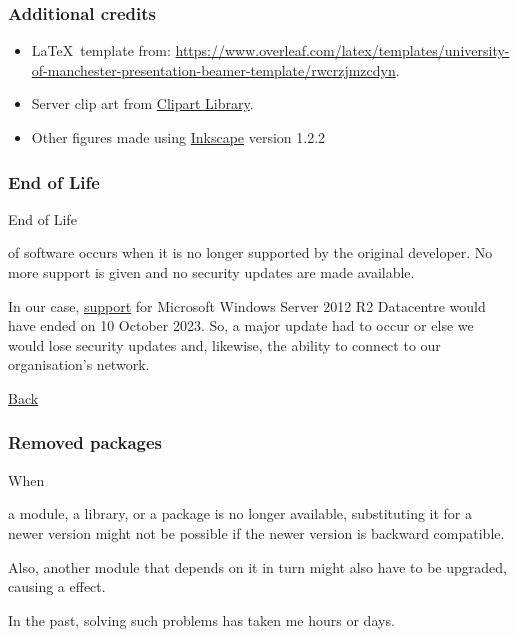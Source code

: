 \documentclass[11pt,aspectratio=43,ignorenonframetext,t]{beamer}
\begin{document}
\begin{frame}

\frametitle{Additional credits}

\begin{itemize}
  \item \LaTeX\ template from:  \href{https://www.overleaf.com/latex/templates/university-of-manchester-presentation-beamer-template/rwcrzjmzcdyn}{https://www.overleaf.com/latex/templates/university-of-manchester-presentation-beamer-template/rwcrzjmzcdyn}.
  \item Server clip art from \href{https://clipart-library.com/}{Clipart Library}.
  \item Other figures made using \href{https://inkscape.org/}{Inkscape} version 1.2.2
\end{itemize}

\end{frame}


\begin{frame}

\frametitle{End of Life}

\hypertarget{slide:eol}{End of Life} of software occurs when it is no longer supported by the original developer.  No more support is given and no security updates are made available.
\vs

In our case, \href{https://en.wikipedia.org/wiki/Windows\_Server\_2012\_R2}{support} for Microsoft Windows Server 2012 R2 Datacentre would have ended on 10 October 2023.  So, a major update had to occur or else we would lose security updates and, likewise, the ability to connect to our organisation's network.
\vspace{3cm}

{\hfill}{\hyperlink{slide:layered}{Back}}

\end{frame}


\begin{frame}

\frametitle{Removed packages}

\hypertarget{slide:removedpkgs}{When} a module, a library, or a package is no longer available, substituting it for a newer version might not be possible if the newer version is {} backward compatible.
\vs

Also, another module that depends on it in turn might also have to be upgraded, causing a {} effect.
\vs

In the past, solving such problems has taken me hours or days.

\end{frame}
\end{document}
